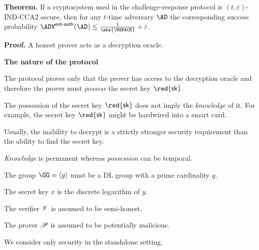 \documentclass[landscape,footrule]{foils}
\renewcommand{\SK}{{\red{\mathsf{sk}}}}
\begin{document}



\textbf{Theorem.}  If a cryptosystem used in the challenge-response
protocol is $(t,\varepsilon)$-IND-CCA2 secure, then for any  $t$-time
adversary $\AD$ the corresponding success probability 
$\advEAUTHXX{}{\AD}\leq\frac{1}{\abs{\MSPACE}}+\varepsilon$.

\textbf{Proof.} A honest prover acts as a decryption
oracle.
\bigskip

\textbf{The nature of the protocol}
\begin{triangles}
\item The protocol proves only that the prover has access to the
  decryption oracle and therefore the prover must \emph{possess} the
  secret key $\SK$.
\item The possession of the secret key $\SK$ does not imply the
  \emph{knowledge} of it. For example, the secret key $\SK$ might be
  hardwired into a smart card.
\item Usually, the inability to decrypt is a strictly stronger
  security requirement than the ability to find the secret key.
\item \emph{Knowledge} is permanent whereas \emph{possession} can be
  temporal.
\end{triangles}





The group $\GG=\langle g\rangle$ must be a DL group with a prime cardinality $q$.
\begin{triangles}
  \item The secret key $x$ is the discrete logarithm of $y$.
  \item The verifier $\mathscr{V}$ is assumed to be semi-honest.
  \item The prover $\mathscr{P}$ is assumed to be potentially malicious. 
  \item We consider only security in the standalone setting.
\end{triangles}


\end{document}
